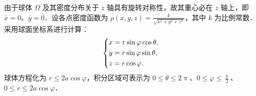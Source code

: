 \begin{solution}
    由于球体 $\Omega$ 及其密度分布关于 $z$ 轴具有旋转对称性，故其重心必在 $z$ 轴上，即 $\bar{x} = 0$、$\bar{y} = 0$．设各点密度函数为 $\rho(x, y, z) = \frac{k}{\sqrt{x^2 + y^2 + z^2}}$，其中 $k$ 为比例常数．采用球面坐标系进行计算：
    \begin{equation}
        \label{eq:Coordinate-Transformation-1}
        \begin{dcases}
            x = r \sin \varphi \cos \theta, \\
            y = r \sin \varphi \sin \theta, \\
            z = r \cos \varphi.
        \end{dcases}
    \end{equation}
    球体方程化为 $r \le 2a \cos \varphi$，积分区域可表示为 $0 \le \theta \le 2\uppi$、$0 \le \varphi \le \frac{\uppi}{2}$、$0 \le r \le 2a \cos \varphi$．


\end{solution}
